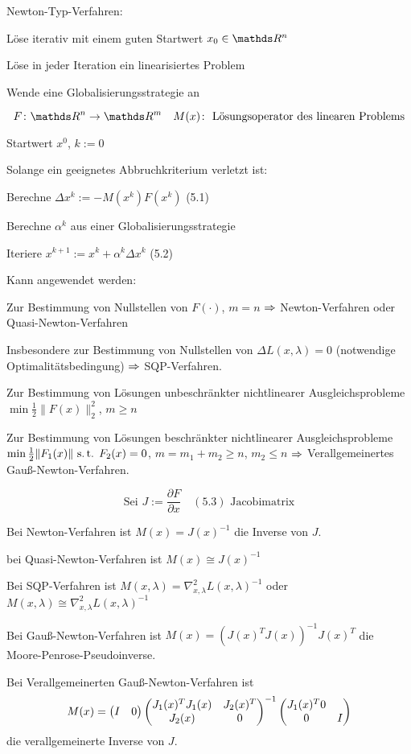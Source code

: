

Newton-Typ-Verfahren:

\bitm
\item Löse iterativ mit einem guten Startwert $x_0 \in \R^n$
\item Löse in jeder Iteration ein linearisiertes Problem
\item Wende eine Globalisierungsstrategie an
\eitm

\[ F\colon \R^n \to \R^m \quad M(x)\colon \text{ Lösungsoperator des linearen Problems} \]


\bitm
\item Startwert $x^0$, $k := 0$
\item Solange ein geeignetes Abbruchkriterium verletzt ist:
\bitm
	\item Berechne $\Delta x^k := - M(x^k) F(x^k)$ (5.1)
	\item Berechne $\alpha^k$ aus einer Globalisierungsstrategie
	\item Iteriere $x^{k+1} := x^k + \alpha^k \Delta x^k$ (5.2)
\eitm
\eitm

Kann angewendet werden:

\bitm
\item Zur Bestimmung von Nullstellen von $F(\cdot)$, $m=n$ $\Rightarrow$ Newton-Verfahren oder Quasi-Newton-Verfahren
\item Insbesondere zur Bestimmung von Nullstellen von $\Delta L(x,\lambda) = 0$ (notwendige Optimalitätsbedingung) $\Rightarrow$ SQP-Verfahren.
\item Zur Bestimmung von Lösungen unbeschränkter nichtlinearer Ausgleichsprobleme $\min \frac 12 \|F(x)\|_2^2$, $m \geq n$
\item Zur Bestimmung von Lösungen beschränkter nichtlinearer Ausgleichsprobleme $\min \frac 12 \|F_1(x)\| \text{ s.\,t. } F_2(x) = 0$, $m = m_1+m_2 \geq n$, $m_2 \leq n$ $\Rightarrow$ Verallgemeinertes Gauß-Newton-Verfahren.
\eitm

\[ \text{Sei } J := \frac{\partial F}{\partial x} \quad (5.3) \text{ Jacobimatrix} \]


\bitm
\item Bei Newton-Verfahren ist $M(x) = J(x)^{-1}$ die Inverse von $J$.
\item bei Quasi-Newton-Verfahren ist $M(x) \cong J(x)^{-1}$
\item Bei SQP-Verfahren ist $M(x, \lambda) = \nabla_{x,\lambda}^2 L(x, \lambda)^{-1}$ oder 
$M(x, \lambda) \cong \nabla_{x,\lambda}^2 L(x, \lambda)^{-1}$
\item Bei Gauß-Newton-Verfahren ist $M(x) = (J(x)^T J(x))^{-1} J(x)^T$ die Moore-Penrose-Pseudoinverse.
\item Bei Verallgemeinerten Gauß-Newton-Verfahren ist \[ M(x) = \begin{pmatrix} I & 0 \end{pmatrix} \begin{pmatrix} J_1(x)^T J_1(x) & J_2(x)^T \\ J_2(x) & 0 \end{pmatrix}^{-1} \begin{pmatrix} J_1(x)^T 0 \\ 0 & I \end{pmatrix} \] die verallgemeinerte Inverse von $J$.
\eitm

